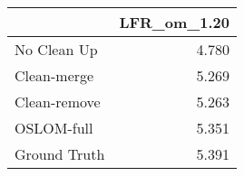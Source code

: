\begin{tabular}{lr}
\toprule
{} & LFR_om_1.20 \\
\midrule
No Clean Up  &       4.780 \\
Clean-merge  &       5.269 \\
Clean-remove &       5.263 \\
OSLOM-full   &       5.351 \\
Ground Truth &       5.391 \\
\bottomrule
\end{tabular}
